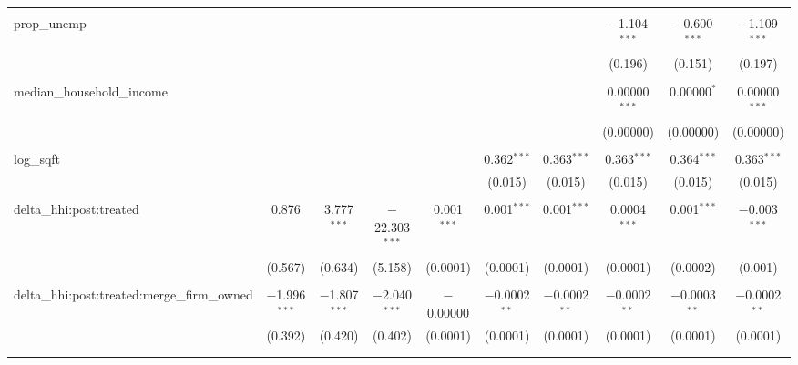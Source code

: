 \begin{table}[H]
{\begin{tabular}{@{\extracolsep{5pt}}lccccccccc}
   & & & & & & & & & \\  

  prop\_unemp &  &  &  &  &  &  & $-$1.104$^{***}$ & $-$0.600$^{***}$ & $-$1.109$^{***}$ \\  

   &  &  &  &  &  &  & (0.196) & (0.151) & (0.197) \\  

   & & & & & & & & & \\  

  median\_household\_income &  &  &  &  &  &  & 0.00000$^{***}$ & 0.00000$^{*}$ & 0.00000$^{***}$ \\  

   &  &  &  &  &  &  & (0.00000) & (0.00000) & (0.00000) \\  

   & & & & & & & & & \\  

  log\_sqft &  &  &  &  & 0.362$^{***}$ & 0.363$^{***}$ & 0.363$^{***}$ & 0.364$^{***}$ & 0.363$^{***}$ \\  

   &  &  &  &  & (0.015) & (0.015) & (0.015) & (0.015) & (0.015) \\  

   & & & & & & & & & \\  

  delta\_hhi:post:treated & 0.876 & 3.777$^{***}$ & $-$22.303$^{***}$ & 0.001$^{***}$ & 0.001$^{***}$ & 0.001$^{***}$ & 0.0004$^{***}$ & 0.001$^{***}$ & $-$0.003$^{***}$ \\  

   & (0.567) & (0.634) & (5.158) & (0.0001) & (0.0001) & (0.0001) & (0.0001) & (0.0002) & (0.001) \\  

   & & & & & & & & & \\  

  delta\_hhi:post:treated:merge\_firm\_owned & $-$1.996$^{***}$ & $-$1.807$^{***}$ & $-$2.040$^{***}$ & $-$0.00000 & $-$0.0002$^{**}$ & $-$0.0002$^{**}$ & $-$0.0002$^{**}$ & $-$0.0003$^{**}$ & $-$0.0002$^{**}$ \\  

   & (0.392) & (0.420) & (0.402) & (0.0001) & (0.0001) & (0.0001) & (0.0001) & (0.0001) & (0.0001) \\  

   & & & & & & & & & \\  

 \hline \\[-1.8ex]  


\end{tabular}}
\end{table}
